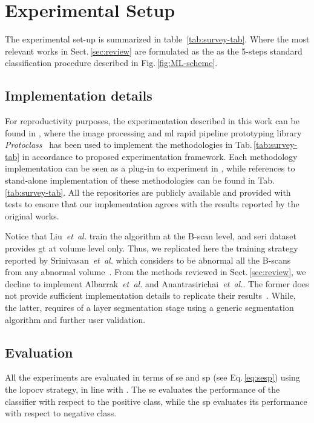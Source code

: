\graphicspath{ {./content/method/figures/} }

\section{Experimental Setup}\label{sec:exp}

The experimental set-up is summarized in table~\ref{tab:survey-tab}.
Where the most relevant works in Sect.\,\ref{sec:review} are formulated as the as the 5-steps standard classification procedure described in Fig.\,\ref{fig:ML-scheme}.



\subsection{Implementation details}\label{sec:exp:implementation}
For reproductivity purposes, the experimentation described in this work can be found in \cite{rethinopaty20016apr-repoICPR},
where the image processing and \gls{ml} rapid pipeline prototyping library \emph{Protoclass}~\cite{protoclass2016apr-repoICPR} has been used to implement the methodologies in Tab.\,\ref{tab:survey-tab} in accordance to proposed experimentation framework.
Each methodology implementation can be seen as a plug-in to experiment in \cite{rethinopaty20016apr-repoICPR}, while references to stand-alone implementation of these methodologies can be found in Tab.\,\ref{tab:survey-tab}.
All the repositories are publicly available and provided with tests to ensure that our implementation agrees with the results reported by the original works.

Notice that Liu~\emph{et~al.} train the algorithm at the B-scan level, and \gls{seri} dataset provides \gls{gt} at volume level only.
Thus, we replicated here the training strategy reported by Srinivasan~\emph{et~al.} which considers to be abnormal all the B-scans from any abnormal volume~\cite{Srinivasan2014}.
From the methods reviewed in Sect.\,\ref{sec:review}, we decline to implement Albarrak~\emph{et~al.} and Anantrasirichai~\textit{et~al.}.
The former does not provide sufficient implementation details to replicate their results~\cite{albarrak2013age}.
While, the latter, requires of a layer segmentation stage using a generic segmentation algorithm and further user validation.


\subsection{Evaluation}\label{sec:exp:evaluation}
All the experiments are evaluated in terms of \gls{se} and \gls{sp} (see Eq.\,\ref{eq:sesp}) using the \gls{lopocv} strategy, in line with \cite{Lemaintre2015miccaiOCT}.
The \gls{se} evaluates the performance of the classifier with respect to the positive class, while the \gls{sp} evaluates its performance with respect to negative class.

